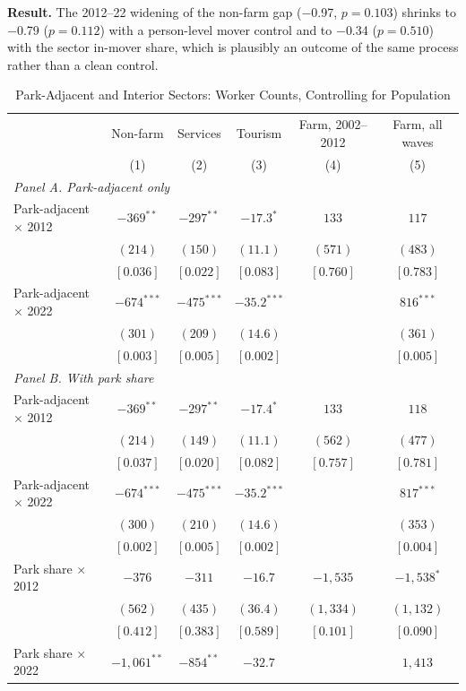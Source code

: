 \documentclass[11pt]{article}
\begin{document}
\textbf{Result.} The 2012--22 widening of the non-farm gap ($-$0.97, $p=0.103$) shrinks to $-$0.79 ($p=0.112$) with a person-level mover control and to $-$0.34 ($p=0.510$) with the sector in-mover share, which is plausibly an outcome of the same process rather than a clean control.
\clearpage
\begin{table}[H]
\centering\small\setlength{\tabcolsep}{4pt}
\caption{Park-Adjacent and Interior Sectors: Worker Counts, Controlling for Population}
\label{tab:levels}
\begin{tabular}{lccccc}
\toprule
 & Non-farm & Services & Tourism & Farm, 2002--2012 & Farm, all waves \\
 & (1) & (2) & (3) & (4) & (5) \\
\midrule
\multicolumn{6}{l}{\textit{Panel A. Park-adjacent only}} \\
Park-adjacent $\times$ 2012 & $-369^{**}$ & $-297^{**}$ & $-17.3^{*}$ & $133$ & $117$ \\
 & $(214)$ & $(150)$ & $(11.1)$ & $(571)$ & $(483)$ \\
 & $[0.036]$ & $[0.022]$ & $[0.083]$ & $[0.760]$ & $[0.783]$ \\
Park-adjacent $\times$ 2022 & $-674^{***}$ & $-475^{***}$ & $-35.2^{***}$ &  & $816^{***}$ \\
 & $(301)$ & $(209)$ & $(14.6)$ &  & $(361)$ \\
 & $[0.003]$ & $[0.005]$ & $[0.002]$ &  & $[0.005]$ \\
\multicolumn{6}{l}{\textit{Panel B. With park share}} \\
Park-adjacent $\times$ 2012 & $-369^{**}$ & $-297^{**}$ & $-17.4^{*}$ & $133$ & $118$ \\
 & $(214)$ & $(149)$ & $(11.1)$ & $(562)$ & $(477)$ \\
 & $[0.037]$ & $[0.020]$ & $[0.082]$ & $[0.757]$ & $[0.781]$ \\
Park-adjacent $\times$ 2022 & $-674^{***}$ & $-475^{***}$ & $-35.2^{***}$ &  & $817^{***}$ \\
 & $(300)$ & $(210)$ & $(14.6)$ &  & $(353)$ \\
 & $[0.002]$ & $[0.005]$ & $[0.002]$ &  & $[0.004]$ \\
Park share $\times$ 2012 & $-376$ & $-311$ & $-16.7$ & $-1,535$ & $-1,538^{*}$ \\
 & $(562)$ & $(435)$ & $(36.4)$ & $(1,334)$ & $(1,132)$ \\
 & $[0.412]$ & $[0.383]$ & $[0.589]$ & $[0.101]$ & $[0.090]$ \\
Park share $\times$ 2022 & $-1,061^{**}$ & $-854^{**}$ & $-32.7$ &  & $1,413$ \\

\end{tabular}
\end{table}
\end{document}
